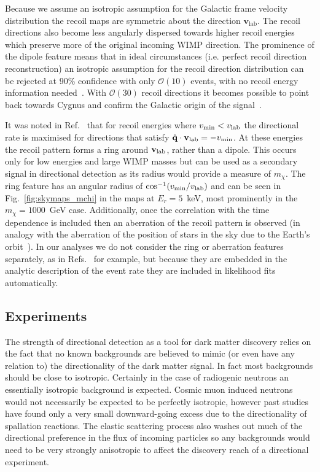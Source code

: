Because we assume an isotropic assumption for the Galactic frame velocity distribution the recoil maps are symmetric about the direction $\textbf{v}_\textrm{lab}$. The recoil directions also become less angularly dispersed towards higher recoil energies which preserve more of the original incoming WIMP direction. The prominence of the dipole feature means that in ideal circumstances (i.e. perfect recoil direction reconstruction) an isotropic assumption for the recoil direction distribution can be rejected at 90\% confidence with only $\mathcal{O}(10)$ events, with no recoil energy information needed~\cite{Green:2010zm}. With $\mathcal{O}(30)$ recoil directions it becomes possible to point back towards Cygnus and confirm the Galactic origin of the signal~\cite{Billard:2009mf}.

It was noted in Ref.~\cite{Bozorgnia:2011vc} that for recoil energies where $v_{\rm min}<v_{\rm lab}$ the directional rate is maximised for directions that satisfy $\hat{\bf{q}}\cdot{\bf v}_{\rm lab} = -v_{\rm min}$. At these energies the recoil pattern forms a ring around $\textbf{v}_{\rm lab}$, rather than a dipole. This occurs only for low energies and large WIMP masses but can be used as a secondary signal in directional detection as its radius would provide a measure of $m_\chi$. The ring feature has an angular radius of $\cos^{-1}(v_\mathrm{min}/v_\textrm{lab})$ and can be seen in Fig.~\ref{fig:skymaps_mchi} in the maps at $E_r = 5$~keV, most prominently in the $m_\chi=1000$~GeV case. Additionally, once the correlation with the time dependence is included then an aberration of the recoil pattern is observed (in analogy with the aberration of the position of stars in the sky due to the Earth's orbit~\cite{Bozorgnia:2012eg}). In our analyses we do not consider the ring or aberration features separately, as in Refs.~\cite{Bozorgnia:2011vc, Bozorgnia:2012eg} for example, but because they are embedded in the analytic description of the event rate they are included in likelihood fits automatically.

\subsection{Experiments}\label{sec:directional_expts}
The strength of directional detection as a tool for dark matter discovery relies on the fact that no known backgrounds are believed to mimic (or even have any relation to) the directionality of the dark matter signal. In fact most backgrounds should be close to isotropic. Certainly in the case of radiogenic neutrons an essentially isotropic background is expected. Cosmic muon induced neutrons would not necessarily be expected to be perfectly isotropic, however past studies~\cite{Mei:2005gm} have found only a very small downward-going excess due to the directionality of spallation reactions. The elastic scattering process also washes out much of the directional preference in the flux of incoming particles so any backgrounds would need to be very strongly anisotropic to affect the discovery reach of a directional experiment.

